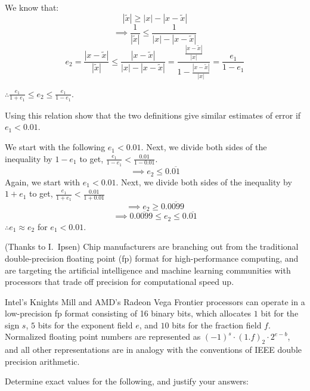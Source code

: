 \documentclass[answers,10pt]{exam}
\begin{document}
\begin{questions}
\begin{solution}
\begin{parts}
We know that:
$$|\tilde{x}|\geq |x|-|x-\tilde{x}|$$
$$\implies \frac{1}{|\tilde{x}|}\leq\frac{1}{|x|-|x-\tilde{x}|}$$
$$e_{2} = \frac{|x-\tilde{x}|}{|\tilde{x}|} \leq \frac{|x-\tilde{x}|}{|x|-|x-\tilde{x}|} = \frac{\frac{|x-\tilde{x}|}{|x|}}{1-\frac{|x-\tilde{x}|}{|x|}} = \frac{e_{1}}{1 - e_{1}}$$
\end{parts}
$\therefore \frac{e_{1}}{1 + e_{1}}\leq e_{2}\leq \frac{e_{1}}{1 - e_{1}}$.
\end{solution}

Using this relation show that the two definitions give similar estimates of error if $e_{1} < 0.01$.
\begin{solution}
We start with the following $e_{1} < 0.01$. Next, we divide both sides of the inequality by $1-e_{1}$ to get, $\frac{e_{1}}{1-e_{1}} < \frac{0.01}{1-0.01}$. 
$$\implies e_{2}\leq0.\overline{01}$$
Again, we start with $e_{1} < 0.01$. Next, we divide both sides of the inequality by $1+e_{1}$ to get, $\frac{e_{1}}{1+e_{1}} < \frac{0.01}{1+0.01}$
$$\implies e_{2}\geq0.\overline{0099}$$
$$$$
$$\implies 0.\overline{0099}\leq e_{2}\leq0.\overline{01}$$
$\therefore e_{1}\approx e_{2}$ for $e_{1}<0.01$.

\end{solution}


\question [10] (Thanks to I.\ Ipsen) Chip manufacturers are branching out from the traditional double-precision floating point (fp) format for high-performance computing, and are targeting the artificial intelligence and machine learning communities with processors that trade off precision for computational speed up.


Intel’s Knights Mill and AMD’s Radeon Vega Frontier processors can operate in a low-precision fp format consisting of 16 binary bits,
which allocates $1$ bit for the sign $s$, $5$ bits for the exponent field $e$, and $10$ bits for the fraction field $f$. Normalized floating point numbers are represented as $(-1)^s \cdot (1.f)_2 \cdot 2^{e-b}$, and all other representations are in analogy with the conventions of IEEE double precision arithmetic.


Determine exact values for the following, and justify your answers:
\end{questions}
\end{document}
